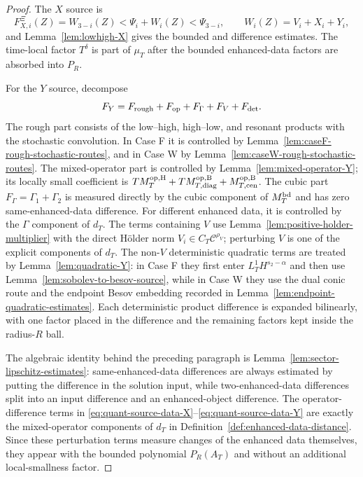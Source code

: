 \documentclass[10pt]{amsart}
\numberwithin{equation}{section}
\theoremstyle{plain}
\theoremstyle{definition}
\theoremstyle{remark}
\begin{document}
\begin{proof}
The $X$ source is
\[
        F_{X,i}^\Xi(Z)=W_{3-i}(Z)<\Psi_i+W_i(Z)<\Psi_{3-i},
        \qquad W_i(Z)=V_i+X_i+Y_i,
\]
and Lemma~\ref{lem:lowhigh-X} gives the bounded and difference estimates.  The time-local factor $T^\delta$ is part of $\mu_T$ after the bounded enhanced-data factors are absorbed into $P_R$.

For the $Y$ source, decompose
\[
        F_Y=F_{\rm rough}+F_{\rm op}+F_\Gamma+F_V+F_{\rm det}.
\]
The rough part consists of the low--high, high--low, and resonant products with the stochastic convolution.  In Case F it is controlled by Lemma~\ref{lem:caseF-rough-stochastic-routes}, and in Case W by Lemma~\ref{lem:caseW-rough-stochastic-routes}.  The mixed-operator part is controlled by Lemma~\ref{lem:mixed-operator-Y}; its locally small coefficient is $T M_T^{\rm op,H}+T M_{T,{\rm diag}}^{\rm op,B}+M_{T,{\rm cen}}^{\rm op,B}$.  The cubic part $F_\Gamma=\Gamma_1+\Gamma_2$ is measured directly by the cubic component of $M_T^{\rm bd}$ and has zero same-enhanced-data difference.  For different enhanced data, it is controlled by the $\Gamma$ component of $d_T$.  The terms containing $V$ use Lemma~\ref{lem:positive-holder-multiplier} with the direct H\"older norm $V_i\in C_T\mathcal C^{\rho_V}$; perturbing $V$ is one of the explicit components of $d_T$.  The non-$V$ deterministic quadratic terms are treated by Lemma~\ref{lem:quadratic-Y}: in Case F they first enter $L_T^1H^{s_2-\alpha}$ and then use Lemma~\ref{lem:sobolev-to-besov-source}, while in Case W they use the dual conic route and the endpoint Besov embedding recorded in Lemma~\ref{lem:endpoint-quadratic-estimates}.  Each deterministic product difference is expanded bilinearly, with one factor placed in the difference and the remaining factors kept inside the radius-$R$ ball.

The algebraic identity behind the preceding paragraph is Lemma~\ref{lem:sector-lipschitz-estimates}: same-enhanced-data differences are always estimated by putting the difference in the solution input, while two-enhanced-data differences split into an input difference and an enhanced-object difference.  The operator-difference terms in \eqref{eq:quant-source-data-X}--\eqref{eq:quant-source-data-Y} are exactly the mixed-operator components of $d_T$ in Definition~\ref{def:enhanced-data-distance}.  Since these perturbation terms measure changes of the enhanced data themselves, they appear with the bounded polynomial $P_R(A_T)$ and without an additional local-smallness factor.
\end{proof}
\end{document}
